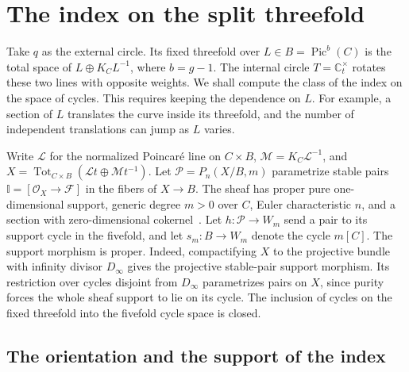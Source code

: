 \section{The index on the split threefold}\label{sec:original}

Take \(q\) as the external circle. Its fixed threefold over
\(L\in B=\operatorname{Pic}^{b}(C)\) is the total space of
\(L\oplus K_C L^{-1}\), where \(b=g-1\). The internal circle
\(T=\mathbb C^\times_t\) rotates these two lines with opposite weights.
We shall compute the class of the index on the space of cycles.
This requires keeping the dependence on \(L\). For example, a section of
\(L\) translates the curve inside its threefold, and the number of
independent translations can jump as \(L\) varies.

Write \(\mathcal L\) for the normalized Poincar\'e line on \(C\times B\),
\(\mathcal M=K_C\mathcal L^{-1}\), and
\(X=\operatorname{Tot}_{C\times B}(\mathcal L t\oplus\mathcal M t^{-1})\).
Let \(\mathcal P=P_n(X/B,m)\) parametrize stable pairs
\(\mathbb I=[\mathcal O_X\to\mathcal F]\) in the fibers of \(X\to B\).
The sheaf has proper pure one-dimensional support, generic degree \(m>0\)
over \(C\), Euler characteristic \(n\), and a section with
zero-dimensional cokernel~\cite{pt}.
Let \(h:\mathcal P\to W_m\) send a pair to its support cycle in the
fivefold, and let \(s_m:B\to W_m\) denote the cycle \(m[C]\).
The support morphism is proper. Indeed, compactifying \(X\) to the
projective bundle with infinity divisor \(D_\infty\) gives the projective
stable-pair support morphism. Its restriction over cycles disjoint
from \(D_\infty\) parametrizes pairs on \(X\), since purity forces the
whole sheaf support to lie on its cycle. The inclusion of cycles on the
fixed threefold into the fivefold cycle space is closed.

\subsection{The orientation and the support of the index}

